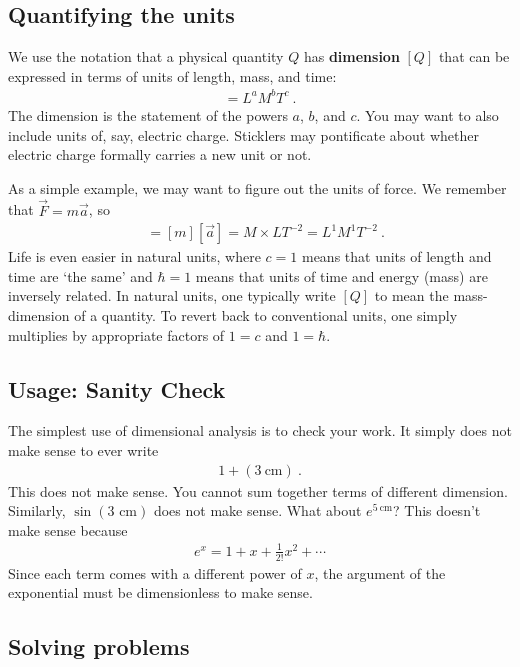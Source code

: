 \subsection{Quantifying the units}

We use the notation that a physical quantity $Q$ has \textbf{dimension} $[Q]$ that can be expressed in terms of units of length, mass, and time:
\begin{align}
  [Q] = L^a M^b T^c \ .
\end{align}
The {dimension} is the statement of the powers $a$, $b$, and $c$. You may want to also include units of, say, electric charge. Sticklers may pontificate about whether electric charge formally carries a new unit or not. 

As a simple example, we may want to figure out the units of force. We remember that $\vec{F} = m\vec{a}$, so 
\begin{align}
  [\vec F] &= [m][\vec{a}] = M\times L T^{-2} = L^1 M^1 T^{-2} \ .
\end{align}
Life is even easier in natural units, where $c=1$ means that units of length and time are `the same’ and $\hbar = 1$ means that units of time and energy (mass) are inversely related. In natural units, one typically write $[Q]$ to mean the mass-dimension of a quantity. To revert back to conventional units, one simply multiplies by appropriate factors of $1=c$ and $1=\hbar$. 

\subsection{Usage: Sanity Check}

The simplest use of dimensional analysis is to check your work. It simply does not make sense to ever write
\begin{align}
  1 + (3~\text{cm}) \ .
\end{align}
This does not make sense. You cannot sum together terms of different dimension. Similarly, $\sin(3\text{ cm})$ does not make sense. What about $e^{5~\text{cm}}$? This doesn't make sense because
\begin{align}
  e^x = 1 + x + \frac{1}{2!} x^2 +  \cdots
\end{align}
Since each term comes with a different power of $x$, the argument of the exponential must be dimensionless to make sense. 

\subsection{Solving problems}

